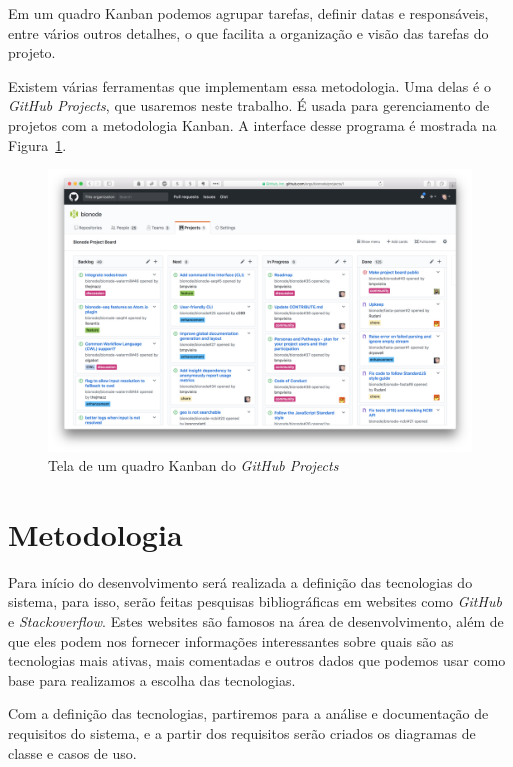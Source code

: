 \documentclass[12pt]{article}
\begin{document}
Em um quadro Kanban podemos agrupar tarefas, definir datas e responsáveis, entre vários outros
detalhes, o que facilita a organização e visão das tarefas do projeto.

Existem várias ferramentas que implementam essa metodologia.
Uma delas é o \emph{GitHub Projects}, que usaremos neste trabalho. É usada para gerenciamento de projetos
com a metodologia Kanban. A interface desse programa é mostrada na Figura~\ref{fig:github-board}.

\begin{figure}[H]
  \centering
  \includegraphics[width=1\textwidth]{github-board.png}
  \caption{Tela de um quadro Kanban do \emph{GitHub Projects}}\label{fig:github-board}
\end{figure}



\section{Metodologia}

Para início do desenvolvimento será realizada a definição das tecnologias do sistema, para isso, serão feitas
pesquisas bibliográficas em websites como \textit{GitHub} e \textit{Stackoverflow}. Estes websites
são famosos na área de desenvolvimento, além de que eles podem nos fornecer informações interessantes sobre quais
são as tecnologias mais ativas, mais comentadas e outros dados que podemos usar como base para realizamos
a escolha das tecnologias.

Com a definição das tecnologias, partiremos para a análise e documentação de requisitos do sistema, e a partir
dos requisitos serão criados os diagramas de classe e casos de uso.
\end{document}
